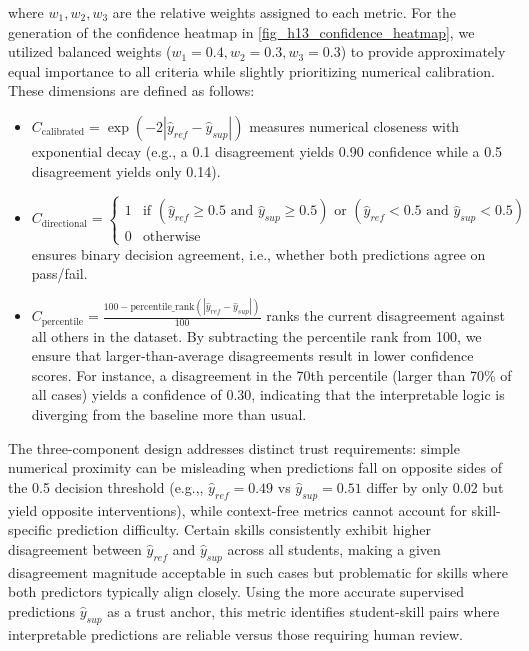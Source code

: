 \documentclass[applsci,article,submit,moreauthors,pdftex]{Definitions/mdpi}
\begin{document}
where $w_1, w_2, w_3$ are the relative weights assigned to each metric. For the generation of the confidence heatmap in \cref{fig_h13_confidence_heatmap}, we utilized balanced weights ($w_1 = 0.4, w_2 = 0.3, w_3 = 0.3$) to provide approximately equal importance to all criteria while slightly prioritizing numerical calibration. These dimensions are defined as follows:

\begin{itemize}
    \item $C_{\text{calibrated}} = \exp(-2|\hat{y}_{ref} - \hat{y}_{sup}|)$ measures numerical closeness with exponential decay (e.g., a 0.1 disagreement yields 0.90 confidence while a 0.5 disagreement yields only 0.14).
    
    \item $C_{\text{directional}} = \begin{cases} 
    1 & \text{if } (\hat{y}_{ref} \geq 0.5 \text{ and } \hat{y}_{sup} \geq 0.5) \text{ or } (\hat{y}_{ref} < 0.5 \text{ and } \hat{y}_{sup} < 0.5) \\
    0 & \text{otherwise}
    \end{cases}$ ensures binary decision agreement, i.e., whether both predictions agree on pass/fail.
    
    \item $C_{\text{percentile}} = \frac{100 - \text{percentile\_rank}(|\hat{y}_{ref} - \hat{y}_{sup}|)}{100}$ ranks the current disagreement against all others in the dataset. By subtracting the percentile rank from 100, we ensure that larger-than-average disagreements result in lower confidence scores. For instance, a disagreement in the 70th percentile (larger than 70\% of all cases) yields a confidence of 0.30, indicating that the interpretable logic is diverging from the baseline more than usual.
\end{itemize}


The three-component design addresses distinct trust requirements: simple numerical proximity can be misleading when predictions fall on opposite sides of the 0.5 decision threshold (e.g.,, $\hat{y}_{ref}=0.49$ vs $\hat{y}_{sup}=0.51$ differ by only 0.02 but yield opposite interventions), while context-free metrics cannot account for skill-specific prediction difficulty. Certain skills consistently exhibit higher disagreement between $\hat{y}_{ref}$ and $\hat{y}_{sup}$ across all students, making a given disagreement magnitude acceptable in such cases but problematic for skills where both predictors typically align closely. Using the more accurate supervised predictions $\hat{y}_{sup}$ as a trust anchor, this metric identifies student-skill pairs where interpretable predictions are reliable versus those requiring human review.
\end{document}
